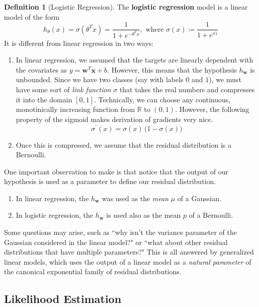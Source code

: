 \documentclass{article}
\theoremstyle{definition}
\theoremstyle{remark}
\theoremstyle{definition}
\newtheorem{definition}{Definition}[section]
\begin{document}
\begin{definition}[Logistic Regression]
The \textbf{logistic regression} model is a linear model of the form 
\[h_\theta (x) = \sigma (\theta^T x) = \frac{1}{1 + e^{- \theta^T x}}, \text{ where } \sigma(x) \coloneqq \frac{1}{1 + e^{x)}}\]
It is different from linear regression in two ways: 
\begin{enumerate}
    \item In linear regression, we assumed that the targets are linearly dependent with the covariates as $y = \mathbf{w}^T \mathbf{x} + b$. However, this means that the hypothesis $h_\mathbf{w}$ is unbounded. Since we have two classes (say with labels $0$ and $1$), we must have some sort of \textit{link function} $\sigma$ that takes the real numbers and compresses it into the domain $[0, 1]$. Technically, we can choose any continuous, monotinically increasing function from $\mathbb{R}$ to $(0, 1)$. However, the following property of the sigmoid makes derivation of gradients very nice. 
    \[\sigma^\prime (x) = \sigma(x) \, \big(1 - \sigma(x) \big)\]

    \item Once this is compressed, we assume that the residual distribution is a Bernoulli. 
\end{enumerate}
\end{definition}

One important observation to make is that notice that the output of our hypothesis is used as a parameter to define our residual distribution. 
\begin{enumerate}
    \item In linear regression, the $h_\mathbf{w}$ was used as the \textit{mean} $\mu$ of a Gaussian. 
    \item In logistic regression, the $h_\mathbf{w}$ is used also as the mean $p$ of a Bernoulli. 
\end{enumerate}
Some questions may arise, such as ``why isn't the variance parameter of the Gaussian considered in the linear model?" or ``what about other residual distributions that have multiple parameters?" This is all answered by generalized linear models, which uses the output of a linear model as a \textit{natural parameter} of the canonical exponential family of residual distributions. 

\subsection{Likelihood Estimation}
\end{document}
